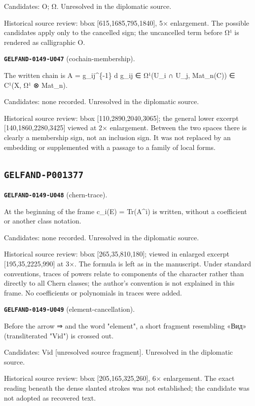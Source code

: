 \documentclass[11pt]{article}
\theoremstyle{definition}
\theoremstyle{remark}
\begin{document}
Candidates: O; Ω. Unresolved in the diplomatic source.\par
Historical source review: bbox [615,1685,795,1840], 5× enlargement. The possible candidates apply only to the cancelled sign; the uncancelled term before Ω¹ is rendered as calligraphic O.\par\medskip
\noindent\leavevmode{}\label{GELFAND-P001376:cochain-membership:note}\textbf{\texttt{GELFAND-0149-U047}} (cochain-membership).\par\nopagebreak[4]
The written chain is A = g\_ij\textasciicircum{}\{-1\} d g\_ij ∈ Ω¹(U\_i ∩ U\_j, Mat\_n(C)) ∈ C¹(X, Ω¹ ⊗ Mat\_n).\par
Candidates: none recorded. Unresolved in the diplomatic source.\par
Historical source review: bbox [110,2890,2040,3065]; the general lower excerpt [140,1860,2280,3425] viewed at 2× enlargement. Between the two spaces there is clearly a membership sign, not an inclusion sign. It was not replaced by an embedding or supplemented with a passage to a family of local forms.\par\medskip

\subsection*{\texttt{GELFAND-P001377}}
\noindent\leavevmode{}\label{GELFAND-P001377:chern-trace:note}\textbf{\texttt{GELFAND-0149-U048}} (chern-trace).\par\nopagebreak[4]
At the beginning of the frame c\_i(E) = Tr(A\textasciicircum{}i) is written, without a coefficient or another class notation.\par
Candidates: none recorded. Unresolved in the diplomatic source.\par
Historical source review: bbox [265,35,810,180]; viewed in enlarged excerpt [195,35,2225,990] at 3×. The formula is left as in the manuscript. Under standard conventions, traces of powers relate to components of the character rather than directly to all Chern classes; the author’s convention is not explained in this frame. No coefficients or polynomials in traces were added.\par\medskip
\noindent\leavevmode{}\label{GELFAND-P001377:element-cancellation:note}\textbf{\texttt{GELFAND-0149-U049}} (element-cancellation).\par\nopagebreak[4]
Before the arrow ⇒ and the word "element", a short fragment resembling «Вид» (transliterated "Vid") is crossed out.\par
Candidates: Vid [unresolved source fragment]. Unresolved in the diplomatic source.\par
Historical source review: bbox [205,165,325,260], 6× enlargement. The exact reading beneath the dense slanted strokes was not established; the candidate was not adopted as recovered text.\par\medskip
\end{document}
